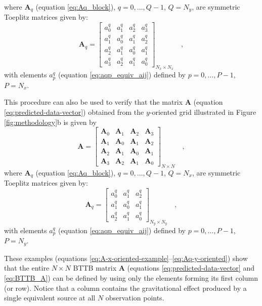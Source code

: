 where $\mathbf{A}_{q}$ (equation \ref{eq:Aq_block}), $q = 0, \dots, Q -1$, $Q = N_{y}$, 
are symmetric Toeplitz matrices given by:
\begin{equation}
\mathbf{A}_{q} = \begin{bmatrix}
a^{q}_{0} & a^{q}_{1} & a^{q}_{2} & a^{q}_{3} \\
a^{q}_{1} & a^{q}_{0} & a^{q}_{1} & a^{q}_{2} \\
a^{q}_{2} & a^{q}_{1} & a^{q}_{0} & a^{q}_{1} \\
a^{q}_{3} & a^{q}_{2} & a^{q}_{1} & a^{q}_{0}
\end{bmatrix}_{N_{x} \times N_{x}} \quad ,
\label{eq:Aq-x-oriented}
\end{equation}
with elements $a^{q}_{p}$ (equation \ref{eq:aqp_equiv_aij}) defined by 
$p = 0, \dots, P - 1$, $P = N_{x}$.

This procedure can also be used to verify that the matrix $\mathbf{A}$ 
(equation \ref{eq:predicted-data-vector}) obtained
from the $y$-oriented grid illustrated in Figure \ref{fig:methodology}b is given by
\begin{equation}
\mathbf{A} = \begin{bmatrix}
\mathbf{A}_{0} & \mathbf{A}_{1} & \mathbf{A}_{2} & \mathbf{A}_{3} \\
\mathbf{A}_{1} & \mathbf{A}_{0} & \mathbf{A}_{1} & \mathbf{A}_{2} \\
\mathbf{A}_{2} & \mathbf{A}_{1} & \mathbf{A}_{0} & \mathbf{A}_{1} \\
\mathbf{A}_{3} & \mathbf{A}_{2} & \mathbf{A}_{1} & \mathbf{A}_{0}
\end{bmatrix}_{N \times N} \quad ,
\label{eq:A-y-oriented-example}
\end{equation}
where $\mathbf{A}_{q}$ (equation \ref{eq:Aq_block}), $q = 0, \dots, Q - 1$, $Q = N_{x}$, 
are symmetric Toeplitz matrices given by:
\begin{equation}
\mathbf{A}_{q} = \begin{bmatrix}
a^{q}_{0} & a^{q}_{1} & a^{q}_{2} \\
a^{q}_{1} & a^{q}_{0} & a^{q}_{1} \\
a^{q}_{2} & a^{q}_{1} & a^{q}_{0}
\end{bmatrix}_{N_{y} \times N_{y}} \quad ,
\label{eq:Aq-y-oriented}
\end{equation}
with elements $a^{q}_{p}$ (equation \ref{eq:aqp_equiv_aij}) defined by 
$p = 0, \dots, P - 1$, $P = N_{y}$.

These examples (equations \ref{eq:A-x-oriented-example}--\ref{eq:Aq-y-oriented}) show 
that the entire $N \times N$ BTTB matrix $\mathbf{A}$ 
(equations \ref{eq:predicted-data-vector} and \ref{eq:BTTB_A}) 
can be defined by using only the elements 
forming its first column (or row). Notice that a column contains the gravitational effect 
produced by a single equivalent source at all $N$ observation points.

